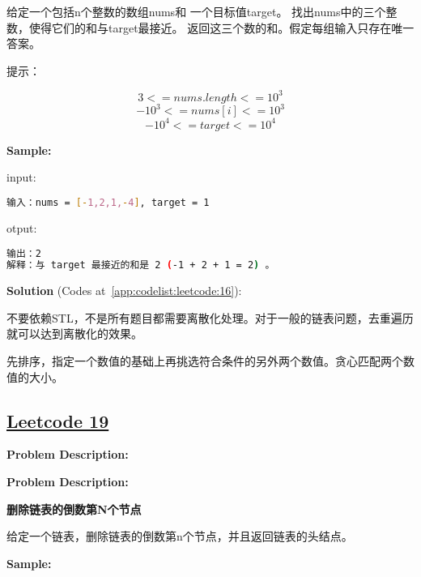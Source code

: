 给定一个包括n个整数的数组nums和 一个目标值target。
找出nums中的三个整数，使得它们的和与target最接近。
返回这三个数的和。假定每组输入只存在唯一答案。\par

提示：\par

$$ 3 <= nums.length <= 10^{3} $$
$$ -10^{3} <= nums[i] <= 10^{3} $$
$$ -10^{4} <= target <= 10^{4} $$


\textbf{Sample:}\par

input:\par

\begin{lstlisting}[language=bash]
输入：nums = [-1,2,1,-4], target = 1
\end{lstlisting}

otput:\par

\begin{lstlisting}[language=bash]
输出：2
解释：与 target 最接近的和是 2 (-1 + 2 + 1 = 2) 。
\end{lstlisting}

\textbf{Solution }(Codes at~\ref{app:codelist:leetcode:16}):\par

不要依赖STL，不是所有题目都需要离散化处理。对于一般的链表问题，去重遍历就可以达到离散化的效果。\par

先排序，指定一个数值的基础上再挑选符合条件的另外两个数值。贪心匹配两个数值的大小。\par



\subsection{\href{https://leetcode-cn.com/}{Leetcode 19}}\label{app:problemlist:leetcode:19}

\textbf{Problem Description:}\par

\textbf{Problem Description:}\par

\textbf{删除链表的倒数第N个节点}\par

给定一个链表，删除链表的倒数第n个节点，并且返回链表的头结点。\par


\textbf{Sample:}\par

